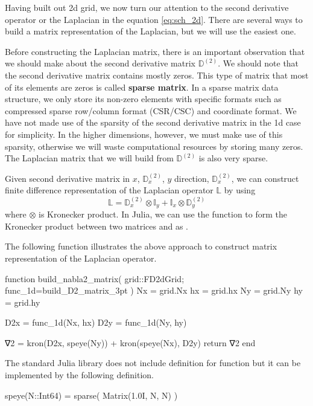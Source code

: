 Having built out 2d grid, we now turn our attention to the second derivative operator or
the Laplacian in the equation \ref{eq:sch_2d}.
There are several ways to build a matrix representation of the Laplacian, but we will
use the easiest one. 

Before constructing the Laplacian matrix, there is an important observation that
we should make about the second derivative matrix $\mathbb{D}^{(2)}$. We should note
that the second derivative matrix contains mostly zeros. This type of matrix that
most of its elements are zeros is called \textbf{sparse matrix}.
In a sparse matrix data structure, we only store its non-zero elements with specific
formats such as compressed sparse row/column format (CSR/CSC) and coordinate format.
We have not made use of the sparsity of the second derivative matrix
in the 1d case for simplicity. In the higher dimensions, however,
we must make use of this sparsity, otherwise we will waste computational resources 
by storing many zeros. The Laplacian matrix that we will build from
$\mathbb{D}^{(2)}$ is also very sparse.

Given second derivative matrix in $x$, $\mathbb{D}^{(2)}_{x}$,
$y$ direction, $\mathbb{D}^{(2)}_{x}$,
we can construct finite difference representation of the Laplacian operator
$\mathbb{L}$ by using
%
\begin{equation}
\mathbb{L} = \mathbb{D}^{(2)}_{x} \otimes \mathbb{I}_{y} +
\mathbb{I}_{x} \otimes \mathbb{D}^{(2)}_{y}
\end{equation}
%
where $\otimes$ is Kronecker product.
In Julia, we can use the function  to form the Kronecker product
between two matrices  and  as .

The following function illustrates the above approach to construct matrix
representation of the Laplacian operator.
\begin{juliacode}
function build_nabla2_matrix( grid::FD2dGrid; func_1d=build_D2_matrix_3pt )
  Nx = grid.Nx
  hx = grid.hx
  Ny = grid.Ny
  hy = grid.hy
    
  D2x = func_1d(Nx, hx)
  D2y = func_1d(Ny, hy)

  ∇2 = kron(D2x, speye(Ny)) + kron(speye(Nx), D2y)
  return ∇2
end
\end{juliacode}

The standard Julia library does not include definition for  function
but it can be implemented by the following definition.
\begin{juliacode}
speye(N::Int64) = sparse( Matrix(1.0I, N, N) )
\end{juliacode}

